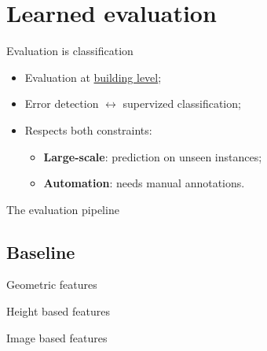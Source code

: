 \documentclass[10pt]{beamer}
\begin{document}
    \section{Learned evaluation}
        \begin{frame}{Evaluation is classification}
            \begin{itemize}[label=$\blacktriangleright$, font=\color{IGNGreen}]
                \item<1-> Evaluation at \underline{building level};
                \item<2-> Error detection \(\leftrightarrow\) supervized classification;
                \item<3-> Respects both constraints:
                    \begin{itemize}[label=$\blacktriangleright$, font=\color{IGNGreen}]
                        \item<4-> \textbf{Large-scale}: prediction on unseen instances;
                        \item<5-> \textbf{Automation}: needs manual annotations.
                    \end{itemize}
            \end{itemize}
        \end{frame}

        \begin{frame}{The evaluation pipeline}
            \begin{figure}[H]
                
            \end{figure}
        \end{frame}

        \subsection{Baseline}
            \begin{frame}{Geometric features}
                \centering
                
            \end{frame}
            \begin{frame}{Height based features}
                \centering
                                
            \end{frame}
            \begin{frame}{Image based features}
                \centering
                                
            \end{frame}
\end{document}
